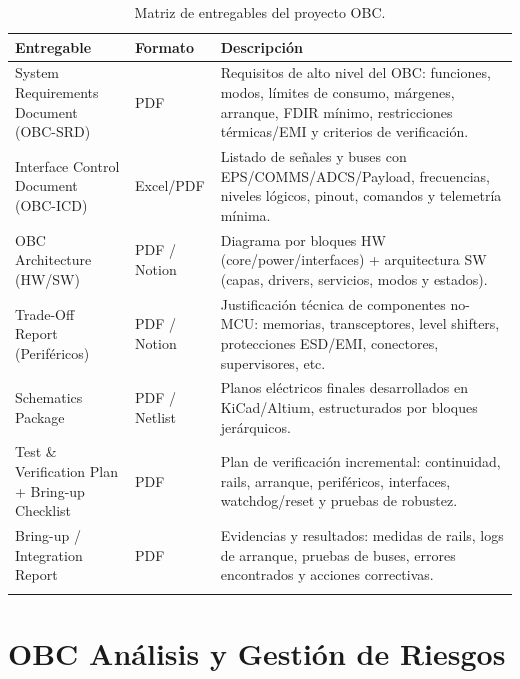 \begin{longtable}{>{\raggedright\arraybackslash}p{3.5cm} >{\raggedright\arraybackslash}p{2.0cm} >{\raggedright\arraybackslash}p{8.0cm}}
\toprule
\textbf{Entregable} & \textbf{Formato} & \textbf{Descripción} \\
\midrule
\endhead

System Requirements Document (OBC-SRD) & PDF &
Requisitos de alto nivel del OBC: funciones, modos, límites de consumo, márgenes, arranque, FDIR mínimo, restricciones térmicas/EMI y criterios de verificación. \\

Interface Control Document (OBC-ICD) & Excel/PDF &
Listado de señales y buses con EPS/COMMS/ADCS/Payload, frecuencias, niveles lógicos, pinout, comandos y telemetría mínima. \\

OBC Architecture (HW/SW) & PDF / Notion &
Diagrama por bloques HW (core/power/interfaces) + arquitectura SW (capas, drivers, servicios, modos y estados). \\

Trade-Off Report (Periféricos) & PDF / Notion &
Justificación técnica de componentes no-MCU: memorias, transceptores, level shifters, protecciones ESD/EMI, conectores, supervisores, etc. \\

Schematics Package & PDF / Netlist &
Planos eléctricos finales desarrollados en KiCad/Altium, estructurados por bloques jerárquicos. \\

Test \& Verification Plan + Bring-up Checklist & PDF &
Plan de verificación incremental: continuidad, rails, arranque, periféricos, interfaces, watchdog/reset y pruebas de robustez. \\

Bring-up / Integration Report & PDF &
Evidencias y resultados: medidas de rails, logs de arranque, pruebas de buses, errores encontrados y acciones correctivas. \\

\bottomrule
\caption{Matriz de entregables del proyecto OBC.}
\end{longtable}

\chapter{OBC Análisis y Gestión de Riesgos}

